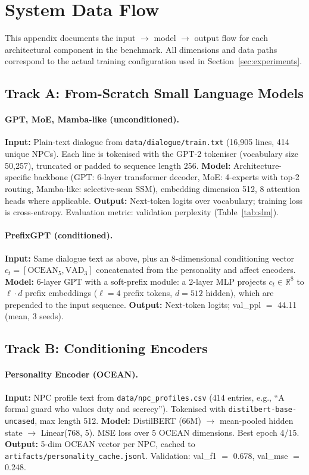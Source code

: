 \documentclass[11pt]{article}
\begin{document}
\section{System Data Flow}
\label{app:dataflow}

This appendix documents the input $\rightarrow$ model $\rightarrow$ output flow for each architectural component in the benchmark.
All dimensions and data paths correspond to the actual training configuration used in Section~\ref{sec:experiments}.

\subsection{Track A: From-Scratch Small Language Models}

\paragraph{GPT, MoE, Mamba-like (unconditioned).}
\textbf{Input:} Plain-text dialogue from \texttt{data/dialogue/train.txt} (16,905 lines, 414 unique NPCs).
Each line is tokenised with the GPT-2 tokeniser (vocabulary size 50,257), truncated or padded to sequence length 256.
\textbf{Model:} Architecture-specific backbone (GPT: 6-layer transformer decoder, MoE: 4-experts with top-2 routing, Mamba-like: selective-scan SSM), embedding dimension 512, 8 attention heads where applicable.
\textbf{Output:} Next-token logits over vocabulary; training loss is cross-entropy.
Evaluation metric: validation perplexity (Table~\ref{tab:slm}).

\paragraph{PrefixGPT (conditioned).}
\textbf{Input:} Same dialogue text as above, plus an 8-dimensional conditioning vector $c_t = [\text{OCEAN}_5, \text{VAD}_3]$ concatenated from the personality and affect encoders.
\textbf{Model:} 6-layer GPT with a soft-prefix module: a 2-layer MLP projects $c_t \in \mathbb{R}^8$ to $\ell \cdot d$ prefix embeddings ($\ell=4$ prefix tokens, $d=512$ hidden), which are prepended to the input sequence.
\textbf{Output:} Next-token logits; val\_ppl $=$ 44.11 (mean, 3 seeds).

\subsection{Track B: Conditioning Encoders}

\paragraph{Personality Encoder (OCEAN).}
\textbf{Input:} NPC profile text from \texttt{data/npc\_profiles.csv} (414 entries, e.g., ``A formal guard who values duty and secrecy'').
Tokenised with \texttt{distilbert-base-uncased}, max length 512.
\textbf{Model:} DistilBERT (66M) $\rightarrow$ mean-pooled hidden state $\rightarrow$ Linear(768, 5).
MSE loss over 5 OCEAN dimensions.
Best epoch 4/15.
\textbf{Output:} 5-dim OCEAN vector per NPC, cached to \texttt{artifacts/personality\_cache.jsonl}.
Validation: val\_f1 $=$ 0.678, val\_mse $=$ 0.248.
\end{document}
